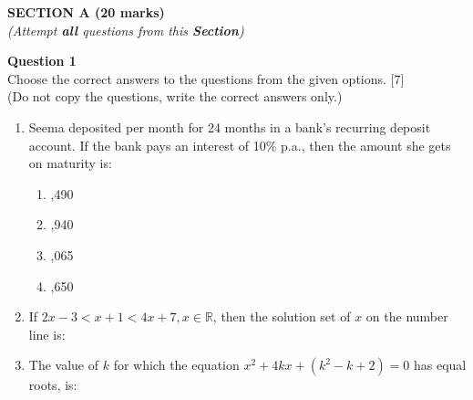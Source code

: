 \begin{center}
   \large
   \textbf{SECTION A (20 marks)}\\
   \vspace{5mm}
   \normalsize
   \textit{(Attempt \textbf{all} questions from this \textbf{Section})}
\end{center}
\par
\noindent
\textbf{Question 1}\\
Choose the correct answers to the questions from the given options. \hfill [7]\\
(Do not copy the questions, write the correct answers only.)
\par
\vspace{2mm}
\begin{enumerate}[label=(\roman*)]

    \item Seema deposited  per month for 24 months in a bank's recurring
        deposit account. If the bank pays an interest of 10\% p.a., then the amount 
        she gets on maturity is:

        \begin{multicols}{2}
        \begin{enumerate}[label=(\alph*)]
            \item {},490 
            \item {},940
            \item {},065
            \item {},650
        \end{enumerate}
        \end{multicols}

    \newpage
    \item If $2x-3 < x+1 < 4x+7, x \in \mathbb{R}$, then the solution set of $x$ on the
       number line is: 


    \item The value of $k$ for which the equation $x^2 + 4kx + (k^2-k+2) = 0$ has equal 
        roots, is:


\end{enumerate}
